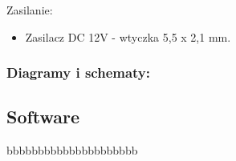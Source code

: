 Zasilanie:
\begin{itemize}
    \item Zasilacz DC 12V - wtyczka 5,5 x 2,1 mm.
\end{itemize}


\subsubsection{Diagramy i schematy:}








\subsection{Software}
bbbbbbbbbbbbbbbbbbbbb